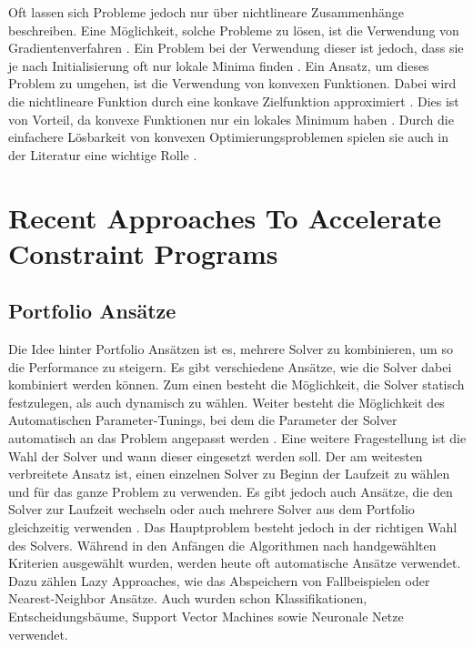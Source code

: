 Oft lassen sich Probleme jedoch nur über nichtlineare Zusammenhänge beschreiben.
Eine Möglichkeit, solche Probleme zu lösen, ist die Verwendung von
Gradientenverfahren \cite[153]{marti21bo}. Ein Problem bei der Verwendung dieser
ist jedoch, dass sie je nach Initialisierung oft nur lokale Minima finden
\cite[9]{boyd04bo}. Ein Ansatz, um dieses Problem zu umgehen, ist die Verwendung
von konvexen Funktionen. Dabei wird die nichtlineare Funktion durch eine konkave
Zielfunktion approximiert \cite[11]{boyd04bo}. Dies ist von Vorteil, da konvexe
Funktionen nur ein lokales Minimum haben \cite[7]{noced06bo}. Durch die
einfachere Lösbarkeit von konvexen Optimierungsproblemen spielen sie auch in der
Literatur eine wichtige Rolle \cite[8]{boyd04bo}.


\section{Recent Approaches To Accelerate Constraint Programs}
\label{sec:Recent-Approaches-To-Accelerate-Constraint-Programs}


\subsection{Portfolio Ansätze}
\label{sec:Portfolio-Ansätze}

Die Idee hinter Portfolio Ansätzen ist es, mehrere Solver zu kombinieren, um so
die Performance zu steigern. Es gibt verschiedene Ansätze, wie die Solver dabei
kombiniert werden können. Zum einen besteht die Möglichkeit, die Solver statisch
festzulegen, als auch dynamisch zu wählen. Weiter besteht die Möglichkeit des
Automatischen Parameter-Tunings, bei dem die Parameter der Solver automatisch an
das Problem angepasst werden \cite[8-11]{kotth12jo}. Eine weitere Fragestellung
ist die Wahl der Solver und wann dieser eingesetzt werden soll. Der am weitesten
verbreitete Ansatz ist, einen einzelnen Solver zu Beginn der Laufzeit zu wählen
und für das ganze Problem zu verwenden. Es gibt jedoch auch Ansätze, die den
Solver zur Laufzeit wechseln oder auch mehrere Solver aus dem Portfolio
gleichzeitig verwenden \cite[11-14]{kotth12jo}. Das Hauptproblem besteht jedoch
in der richtigen Wahl des Solvers. Während in den Anfängen die Algorithmen nach
handgewählten Kriterien ausgewählt wurden, werden heute oft automatische Ansätze
verwendet. Dazu zählen Lazy Approaches, wie das Abspeichern von Fallbeispielen
oder Nearest-Neighbor Ansätze. Auch wurden schon Klassifikationen,
Entscheidungsbäume, Support Vector Machines sowie Neuronale Netze verwendet.

